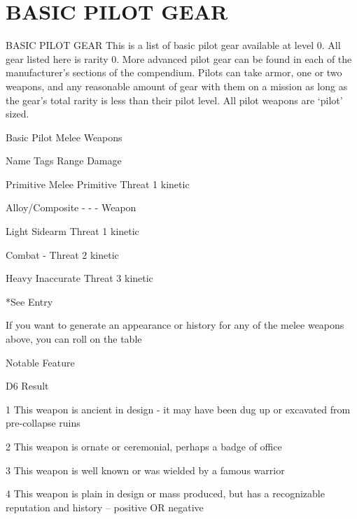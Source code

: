 \section{BASIC PILOT GEAR}
                                         BASIC PILOT GEAR
This is a list of basic pilot gear available at level 0. All gear listed here is rarity 0. More
advanced pilot gear can be found in each of the manufacturer’s sections of the compendium.
Pilots can take armor, one or two weapons, and any reasonable amount of gear with them on a
mission as long as the gear’s total rarity is less than their pilot level. All pilot weapons are ‘pilot’
sized.


                                        Basic Pilot Melee Weapons

 Name                      Tags                                       Range             Damage

 Primitive Melee           Primitive                                  Threat            1 kinetic

 Alloy/Composite           -                                          -                 -
 Weapon

                    Light  Sidearm                                    Threat            1 kinetic

                 Combat    -                                          Threat            2 kinetic

                  Heavy    Inaccurate                                 Threat            3 kinetic

*See Entry





If you want to generate an appearance or history for any of the melee weapons above, you can roll on the
table


                                                      Notable Feature


 D6      Result

  1      This weapon is ancient in design - it may have been dug up or excavated from pre-collapse ruins

 2       This weapon is ornate or ceremonial, perhaps a badge of office

 3       This weapon is well known or was wielded by a famous warrior

 4       This weapon is plain in design or mass produced, but has a recognizable reputation and history -- positive
         OR negative

